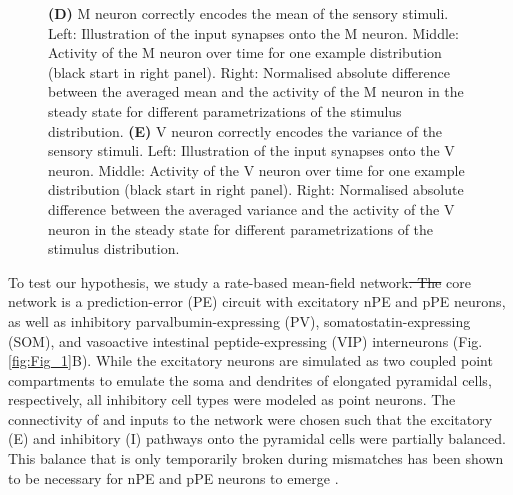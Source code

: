 \documentclass[10pt,a4paper]{article}
\providecommand{\DIFaddtex}[1]{{\protect\color{blue}\uwave{#1}}} %
\providecommand{\DIFdeltex}[1]{{\protect\color{red}\sout{#1}}}                      %
\providecommand{\DIFaddbegin}{} %
\providecommand{\DIFaddend}{} %
\providecommand{\DIFdelbegin}{} %
\providecommand{\DIFdelend}{} %
\providecommand{\DIFadd}[1]{\texorpdfstring{\DIFaddtex{#1}}{#1}} %
\providecommand{\DIFdel}[1]{\texorpdfstring{\DIFdeltex{#1}}{}} %
\newcommand{\DIFscaledelfig}{0.5}
\newlength{\DIFdelgraphicswidth} %
\newlength{\DIFdelgraphicsheight} %
\newcommand{\DIFaddincludegraphics}[2][]{{\color{blue}\fbox{\DIFOincludegraphics[#1]{#2}}}} %
\newcommand{\DIFdelincludegraphics}[2][]{%
\sbox{\DIFdelgraphicsbox}{\DIFOincludegraphics[#1]{#2}}%
\settoboxwidth{\DIFdelgraphicswidth}{\DIFdelgraphicsbox} %
\settoboxtotalheight{\DIFdelgraphicsheight}{\DIFdelgraphicsbox} %
\scalebox{\DIFscaledelfig}{%
\parbox[b]{\DIFdelgraphicswidth}{\usebox{\DIFdelgraphicsbox}\\[-\baselineskip] \rule{\DIFdelgraphicswidth}{0em}}\llap{\resizebox{\DIFdelgraphicswidth}{\DIFdelgraphicsheight}{%
\setlength{\unitlength}{\DIFdelgraphicswidth}%
\begin{picture}(1,1)%
\thicklines\linethickness{2pt} %
{\color[rgb]{1,0,0}\put(0,0){\framebox(1,1){}}}%
{\color[rgb]{1,0,0}\put(0,0){\line( 1,1){1}}}%
{\color[rgb]{1,0,0}\put(0,1){\line(1,-1){1}}}%
\end{picture}%
}\hspace*{3pt}}} %
} %
\DeclareRobustCommand{\DIFaddbegin}{\DIFOaddbegin \let\includegraphics\DIFaddincludegraphics} %
\DeclareRobustCommand{\DIFaddend}{\DIFOaddend \let\includegraphics\DIFOincludegraphics} %
\DeclareRobustCommand{\DIFdelbegin}{\DIFOdelbegin \let\includegraphics\DIFdelincludegraphics} %
\DeclareRobustCommand{\DIFdelend}{\DIFOaddend \let\includegraphics\DIFOincludegraphics} %
\begin{document}
\begin{figure}[t!]
{{\bf (D)} M neuron correctly encodes the mean of the sensory stimuli. Left: Illustration of the input synapses onto the M neuron. Middle: Activity of the M neuron over time for one example distribution (black start in right panel). Right: Normalised absolute difference between the averaged mean and the activity of the M neuron in the steady state for different parametrizations of the stimulus distribution.
{\bf (E)} V neuron correctly encodes the variance of the sensory stimuli. Left: Illustration of the input synapses onto the V neuron. Middle: Activity of the V neuron over time for one example distribution (black start in right panel). Right: Normalised absolute difference between the averaged variance and the activity of the V neuron in the steady state for different parametrizations of the stimulus distribution.
}
\label{fig:Fig_2}
\end{figure}
%

To test our hypothesis, we study a rate-based mean-field network\DIFdelbegin \DIFdel{. The }\DIFdelend \DIFaddbegin \DIFadd{: the }\DIFaddend core network is a prediction-error (PE) circuit with excitatory nPE and pPE neurons, as well as inhibitory parvalbumin-expressing (PV), somatostatin-expressing (SOM), and vasoactive intestinal peptide-expressing (VIP) interneurons (Fig. \ref{fig:Fig_1}B). While the excitatory neurons are simulated as two coupled point compartments to emulate the soma and dendrites of elongated pyramidal cells, respectively, all inhibitory cell types were modeled as point neurons. The connectivity of and inputs to the network were chosen such that the excitatory (E) and inhibitory (I) pathways onto the pyramidal cells were partially balanced. This balance that is only temporarily broken during mismatches has been shown to be necessary for nPE and pPE neurons to emerge \citep[][see Methods]{hertag2020learning, hertag2022prediction}. 
\end{document}
